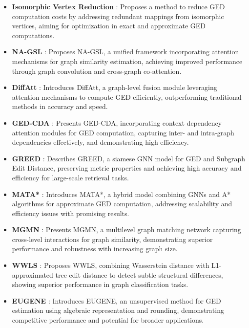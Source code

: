 \documentclass[../Thesis.tex]{subfiles}
\begin{document}
\begin{itemize}
		\item \textbf{Isomorphic Vertex Reduction} \cite{efficient_graph_edit_distance_computation_using_isomorphic_vertices}: Proposes a method to reduce GED computation costs by addressing redundant mappings from isomorphic vertices, aiming for optimization in exact and approximate GED computations.
		
		\item \textbf{NA-GSL} \cite{exploring_attention_mechanism_for_graph_similarity_learning}: Proposes NA-GSL, a unified framework incorporating attention mechanisms for graph similarity estimation, achieving improved performance through graph convolution and cross-graph co-attention.
		
		\item \textbf{DiffAtt} \cite{graph_edit_distance_learning_via_different_attention}: Introduces DiffAtt, a graph-level fusion module leveraging attention mechanisms to compute GED efficiently, outperforming traditional methods in accuracy and speed.
		
		\item \textbf{GED-CDA} \cite{graph_graph_context_dependency_attention_for_graph_edit_distance}: Presents GED-CDA, incorporating context dependency attention modules for GED computation, capturing inter- and intra-graph dependencies effectively, and demonstrating high efficiency.
		
		\item \textbf{GREED} \cite{greed__a_neural_framework_for_learning_graph_distance_functions}: Describes GREED, a siamese GNN model for GED and Subgraph Edit Distance, preserving metric properties and achieving high accuracy and efficiency for large-scale retrieval tasks.
		
		\item \textbf{MATA*} \cite{mata_combining_learnable_node_matching_with_a*_algorithm_for_approximate_graph_edit_distance}: Introduces MATA*, a hybrid model combining GNNs and A* algorithms for approximate GED computation, addressing scalability and efficiency issues with promising results.
		
		\item \textbf{MGMN} \cite{multilevel_graph_matching_networks_for_deep_graph_similarity_learning}: Presents MGMN, a multilevel graph matching network capturing cross-level interactions for graph similarity, demonstrating superior performance and robustness with increasing graph size.
		
		\item \textbf{WWLS} \cite{wasserstein_graph_distance_based_on_l1_approximated_tree_edit_distance_between_weisfeiler_lehman_subtrees}: Proposes WWLS, combining Wasserstein distance with L1-approximated tree edit distance to detect subtle structural differences, showing superior performance in graph classification tasks.
		
		\item \textbf{EUGENE} \cite{eugene__explainable_unsupervised_approximation_of_graph_edit_distance}: Introduces EUGENE, an unsupervised method for GED estimation using algebraic representation and rounding, demonstrating competitive performance and potential for broader applications.
	\end{itemize}
	
	
\end{document}
